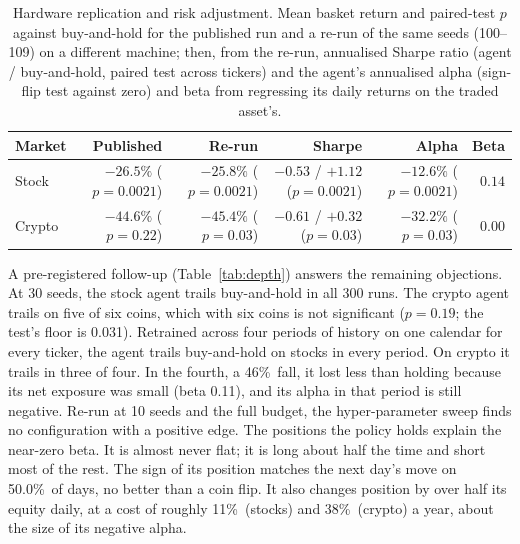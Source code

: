 \documentclass[10pt,twocolumn]{article}
\newcommand{\pc}{\%}  %
\begin{document}
\begin{table}[t]\centering\small
\caption{Hardware replication and risk adjustment. Mean basket return and paired-test $p$ against buy-and-hold for the published run and a re-run of the same seeds (100--109) on a different machine; then, from the re-run, annualised Sharpe ratio (agent / buy-and-hold, paired test across tickers) and the agent's annualised alpha (sign-flip test against zero) and beta from regressing its daily returns on the traded asset's.}
\label{tab:replication}
\begin{tabular}{lrrrrr}
\toprule
Market & Published & Re-run & Sharpe & Alpha & Beta\\
\midrule
Stock  & $-26.5\pc$ ($p{=}0.0021$) & $-25.8\pc$ ($p{=}0.0021$) & $-0.53$ / $+1.12$ ($p{=}0.0021$) & $-12.6\pc$ ($p{=}0.0021$) & $0.14$\\
Crypto & $-44.6\pc$ ($p{=}0.22$) & $-45.4\pc$ ($p{=}0.03$) & $-0.61$ / $+0.32$ ($p{=}0.03$) & $-32.2\pc$ ($p{=}0.03$) & $0.00$\\
\bottomrule
\end{tabular}
\end{table}

A pre-registered follow-up (Table~\ref{tab:depth}) answers the remaining
objections. At 30 seeds, the stock agent trails buy-and-hold in all 300 runs. The
crypto agent trails on five of six coins, which with six coins is not significant
($p{=}0.19$; the test's floor is 0.031). Retrained across four periods of
history on one calendar for every ticker, the agent trails buy-and-hold on stocks in
every period. On crypto it trails in three of four. In the fourth, a 46\pc\ fall,
it lost less than holding because its net exposure was small (beta 0.11), and
its alpha in that period is still negative. Re-run at 10 seeds and the full budget,
the hyper-parameter sweep finds no configuration with a positive edge. The positions
the policy holds explain the near-zero beta. It is almost never flat; it is long
about half the time and short most of the rest. The sign of its position matches the
next day's move on 50.0\pc\ of days, no better than a coin flip. It also changes
position by over half its equity daily, at a cost of roughly 11\pc\ (stocks) and
38\pc\ (crypto) a year, about the size of its negative alpha.
\end{document}
